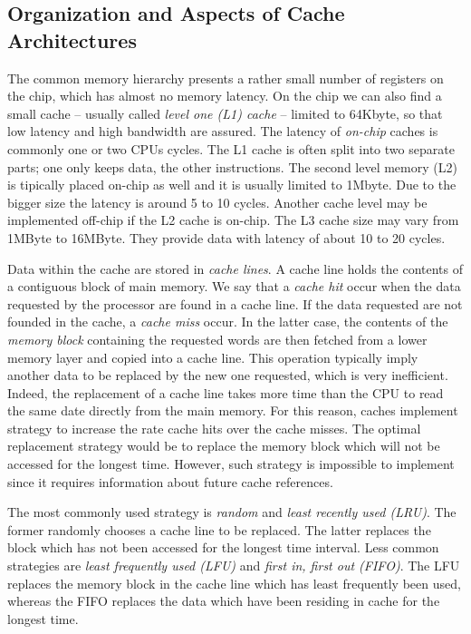\subsection{Organization and Aspects of Cache Architectures}
The common memory hierarchy presents a rather small number of registers on the chip, which has almost no memory latency. On the chip we can also find a small cache -- usually called \textit{level one (L1) cache} -- limited to 64Kbyte, so that low latency and high bandwidth are assured. The latency of \textit{on-chip} caches is commonly one or two CPUs cycles. The L1 cache is often split into two separate parts; one only keeps data, the other instructions. The second level memory (L2) is tipically placed on-chip as well and it is usually limited to 1Mbyte. Due to the bigger size the  latency is around 5 to 10 cycles. Another cache level may be implemented off-chip if the L2 cache is on-chip. The L3 cache size may vary from 1MByte to 16MByte. They provide data with latency of about 10 to 20 cycles.

Data within the cache are stored in \textit{cache lines}. A cache line holds the contents of a contiguous block of main memory. We say that a \textit{cache hit} occur when the data requested by the processor are found in a cache line. If the data requested are not founded in the cache, a \textit{cache miss} occur. In the latter case, the contents of the \textit{memory block} containing the requested words are then fetched from a lower memory layer and copied into a cache line. This operation typically imply another data to be replaced by the new one requested, which is very inefficient. Indeed, the replacement of a cache line takes more time than the CPU to read the same date directly from the main memory. For this reason, caches implement strategy to increase the rate cache hits  over the cache misses. The optimal replacement strategy would be to replace the memory block which will not be accessed for the longest time. However, such strategy is impossible to implement since it requires information about future cache references. 

The most commonly used strategy is \textit{random} and \textit{least recently used (LRU)}. The former randomly chooses a cache line to be replaced. The latter replaces the block which has not been accessed for the longest time interval. Less common strategies are \textit{least frequently used (LFU)} and \textit{first in, first out (FIFO)}. The LFU replaces the memory block in the cache line which has least frequently been used, whereas the FIFO replaces the data which have been residing in cache for the longest time.

